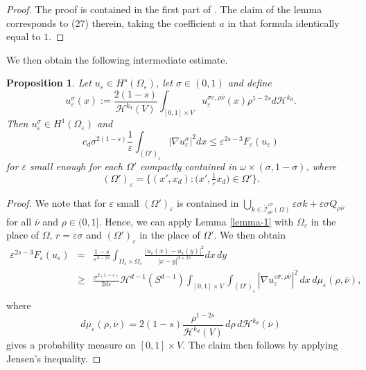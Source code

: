 \documentclass{article}
\newtheorem{proposition}[lemma]{Proposition}
\newcommand{\e}{\varepsilon}
\begin{document}
\begin{proof}
The proof is contained in the first part of \cite[Section 3.1]{BBD}. The claim of the lemma corresponds to (27) therein, taking the coefficient $a$ in that formula identically equal to $1$. 
\end{proof} 

We then obtain the following intermediate estimate.
\begin{proposition}\label{prop4}
Let $u_\e\in H^s(\Omega_\e)$, let $\sigma\in (0,1)$ and define
\begin{equation}\label{sigmae}
u^\sigma_\e(x):=\frac{2(1-s)}{\mathcal{H}^{k_d}(V)} \int_{[0,1]\times V}u^{\sigma\e,\rho\overline{\nu}}_\e(x)\rho^{1-2s}  d\mathcal{H}^{k_d}.
\end{equation}
Then $u^\sigma_\e\in H^1(\Omega_\e)$ and 
\begin{equation}\label{est-2}
c_d\sigma^{2(1-s)}\frac1\e \int_{(\Omega')_\e} |\nabla u^\sigma_\e|^2dx\le \e^{2s-3} F_\e(u_\e)
\end{equation}
for $\e$ small enough for each $\Omega'$ compactly contained in $\omega\times(\sigma,1-\sigma)$,
where
$$
(\Omega')_\e=\big\{(x',x_d): \big(x',\tfrac1\e x_d\big)\in \Omega'\big\}.
$$
\end{proposition}


\begin{proof} We note that for $\e$ small $(\Omega')_\e$ is contained in $\bigcup_{k \in {\mathring{\mathcal I}}^{\e\sigma}_{\rho\overline{\nu}}(\Omega)} \e\sigma k+\e\sigma Q_{\rho\overline{\nu}}$ for all $\overline \nu$ and $\rho\in(0,1]$. Hence, we can apply Lemma \ref{lemma-1} with $\Omega_\e$ in the place of $\Omega$, $r=\e\sigma$ and $(\Omega')_\e$ in the place of $\Omega'$. We then obtain
\begin{eqnarray*}
\e^{2s-3} F_\e(u_\e)&=&\frac{1-s}{\e^{3-2s}}
\int_{\Omega_\e\times\Omega_\e} \frac{|u_\e(x)-u_\e(y)|^2}{|x-y|^{d+2s}} dx\,dy \\
& \ge& \frac{\sigma^{2(1-s)}}{2d\e} \mathcal H^{d-1}(S^{d-1}) \int_{[0,1]\times V} \int_{(\Omega')_\e}  |\nabla u_\e^{\e\sigma,\rho\overline{\nu}}|^2\,dx\, d\mu_\e(\rho,\overline \nu),\\
\end{eqnarray*}
where 
$$
d\mu_\e(\rho,\overline \nu)= 2(1-s)
 \frac{\rho^{1-2s}}{\mathcal{H}^{k_d}(V)}\, d\rho\,d\mathcal{H}^{k_d}(\overline{\nu})
 $$ 
 gives a probability measure on $[0,1]\times V$. The claim then follows by applying Jensen's inequality.
\end{proof} 
\end{document}
